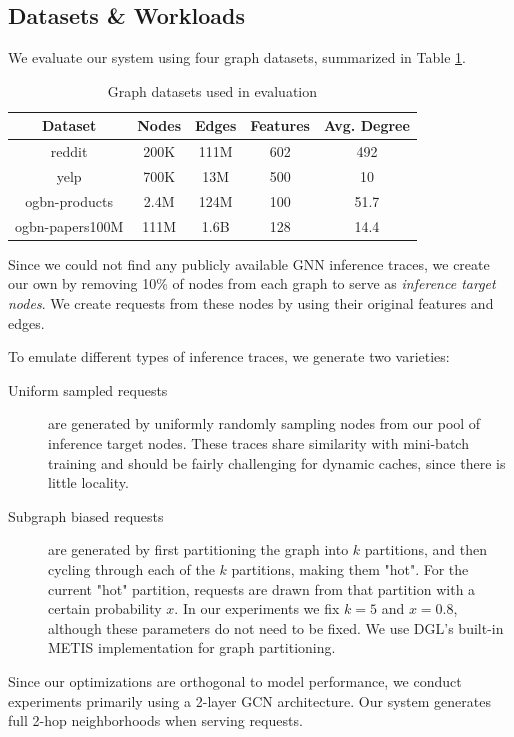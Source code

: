 \subsection{Datasets \& Workloads}
We evaluate our system using four graph datasets, summarized in Table \ref{Eval: Dataset info}.
\begin{table}[h!]
    \begin{center}
        \begin{tabular}{|c c c c c|} 
        \hline
        \textbf{Dataset} & \textbf{Nodes} & \textbf{Edges} & \textbf{Features} & \textbf{Avg. Degree} \\ [0.5ex] 
        \hline\hline
        reddit \cite{GraphSAGE_2017} & 200K & 111M & 602 & 492 \\
        \hline
        yelp \cite{GraphSAINT_2019} & 700K & 13M & 500 & 10 \\
        \hline
        ogbn-products \cite{OGB_2020} & 2.4M & 124M & 100 & 51.7 \\
        \hline
        ogbn-papers100M \cite{OGB_2020} & 111M & 1.6B & 128 & 14.4 \\
        \hline
        \end{tabular}
    \end{center}
    \caption{Graph datasets used in evaluation}
    \label{Eval: Dataset info}
\end{table}
Since we could not find any publicly available GNN inference traces, we create our own by removing 10\% of nodes from each graph to serve as \textit{inference target nodes}. We create requests from these nodes by using their original features and edges. 

To emulate different types of inference traces, we generate two varieties:
\begin{description}
    \item[Uniform sampled requests] are generated by uniformly randomly sampling nodes from our pool of inference target nodes. These traces share similarity with mini-batch training and should be fairly challenging for dynamic caches, since there is little locality.
    \item[Subgraph biased requests] are generated by first partitioning the graph into $k$ partitions, and then cycling through each of the $k$ partitions, making them "hot". For the current "hot" partition, requests are drawn from that partition with a certain probability $x$. In our experiments we fix $k=5$ and $x=0.8$, although these parameters do not need to be fixed. We use DGL's built-in METIS \cite{METIS_1998} implementation for graph partitioning.
\end{description}
Since our optimizations are orthogonal to model performance, we conduct experiments primarily using a 2-layer GCN architecture. Our system generates full 2-hop neighborhoods when serving requests.

